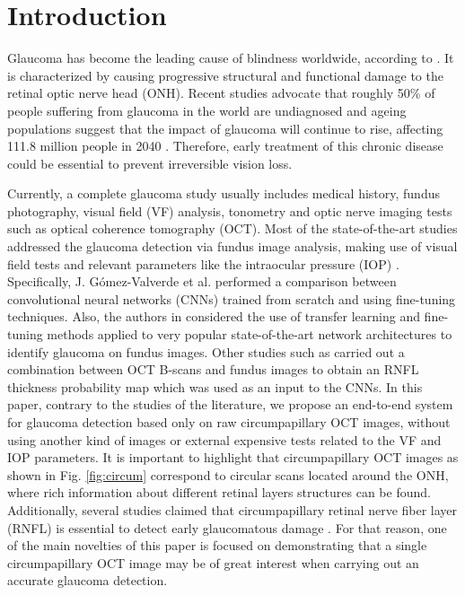 \section{Introduction} \label{sec: Introduction}

Glaucoma has become the leading cause of blindness worldwide, according to \cite{jonas2018}. It is characterized by causing progressive structural and functional damage to the retinal optic nerve head (ONH). Recent studies advocate that roughly 50\% of people suffering from glaucoma in the world are undiagnosed and ageing populations suggest that the impact of glaucoma will continue to rise, affecting 111.8 million people in 2040 \cite{reference2_intro}. Therefore, early treatment of this chronic disease could be essential to prevent irreversible vision loss. 

Currently, a complete glaucoma study usually includes medical history, fundus photography, visual field (VF) analysis, tonometry and optic nerve imaging tests such as optical coherence tomography (OCT). Most of the state-of-the-art studies addressed the glaucoma detection via fundus image analysis, making use of visual field tests and relevant parameters like the intraocular pressure (IOP) \cite{kim2017, wang2019}. Specifically, J. Gómez-Valverde et al. \cite{gomez2019automatic} performed a comparison between convolutional neural networks (CNNs) trained from scratch and using fine-tuning techniques. Also, the authors in \cite{shibata2018development,christopher2018performance} considered the use of transfer learning and fine-tuning methods applied to very popular state-of-the-art network architectures to identify glaucoma on fundus images. Other studies such as \cite{muhammad2017hybrid, thakoor2019} carried out a combination between OCT B-scans and fundus images to obtain an RNFL thickness probability map which was used as an input to the CNNs. In this paper, contrary to the studies of the literature, we propose an end-to-end system for glaucoma detection based only on raw circumpapillary OCT images, without using another kind of images or external expensive tests related to the VF and IOP parameters. 
It is important to highlight that circumpapillary OCT images as shown in Fig. \ref{fig:circum} correspond to circular scans located around the ONH, where rich information about different retinal layers structures can be found. Additionally, several studies claimed that circumpapillary retinal nerve fiber layer (RNFL) is essential to detect early glaucomatous damage \cite{reference_objetive1, reference_objetive2, reference_objetive3}. For that reason, one of the main novelties of this paper is focused on demonstrating that a single circumpapillary OCT image may be of great interest when carrying out an accurate glaucoma detection.

